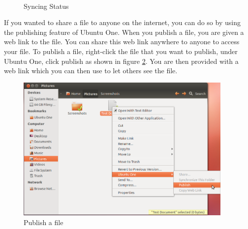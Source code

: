 \begin{figure}[ht!]	
		\centering		
		~ \hspace{0.5in}
		~ \hspace{0.5in}
		\caption{Syncing Status}
		\label{fig:syncing_status}
\end{figure}

\par \noindent If you wanted to share a file to anyone on the internet, you can do so by using the publishing feature of Ubuntu One. When you publish a file, you are given a web link to the file. You can share this web link anywhere to anyone to access your file. To publish a file, right-click the file that you want to publish, under Ubuntu One, click publish as shown in figure \ref{fig:publish}. You are then provided with a web link which you can then use to let others see the file.  \\

\begin{figure}[h!]	
	\centering
	\includegraphics[width=300pt]{./images/basic-tasks/publish.png}
	\caption{Publish a file}	
	\label{fig:publish}		
\end{figure}

